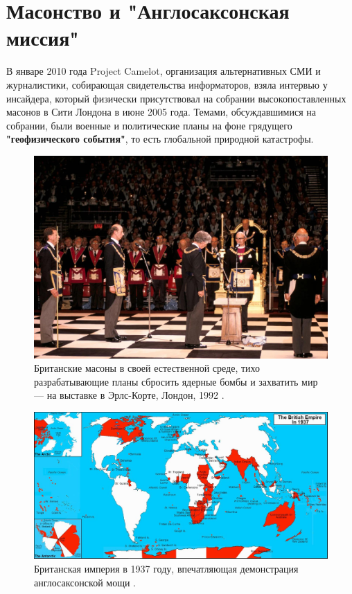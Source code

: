 \documentclass[10pt,twocolumn,letterpaper]{article}
\begin{document}
\section{Масонство и "Англосаксонская миссия"}

В январе 2010 года Project Camelot, организация альтернативных СМИ и журналистики, собирающая свидетельства информаторов, взяла интервью \cite{4,6} у инсайдера, который физически присутствовал на собрании высокопоставленных масонов в Сити Лондона в июне 2005 года. Темами, обсуждавшимися на собрании, были военные и политические планы на фоне грядущего \textbf{"геофизического события"}, то есть глобальной природной катастрофы.

\begin{figure}[b]
\begin{center}
   \includegraphics[width=1\linewidth]{freemason.jpg}
\end{center}
   \caption{Британские масоны в своей естественной среде, тихо разрабатывающие планы сбросить ядерные бомбы и захватить мир — на выставке в Эрлс-Корте, Лондон, 1992 \cite{5}.}
\label{fig:1}
\label{fig:onecol}
\end{figure}

\begin{figure}[t]
\begin{center}
\includegraphics[width=1\textwidth]{british.jpg}
\end{center}

   \caption{Британская империя в 1937 году, впечатляющая демонстрация англосаксонской мощи \cite{14}.}
   \label{fig:2}
\end{figure}
\end{document}
